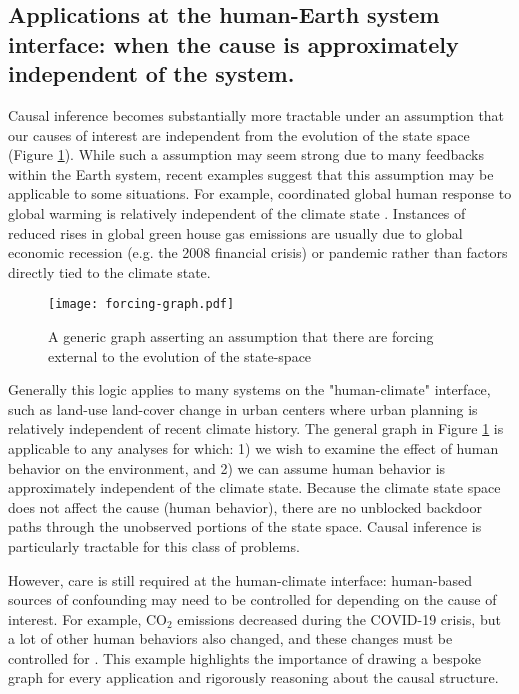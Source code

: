 \documentclass[12pt]{article}
\begin{document}
\subsection{Applications at the human-Earth system interface: when the
  cause is approximately independent of the system.}
\label{human}

Causal inference becomes substantially more tractable under an
assumption that our causes of interest are independent from the
evolution of the state space (Figure \ref{fig:forcing}). While such a
assumption may seem strong due to many feedbacks within
the Earth system, recent examples suggest that this
assumption may be applicable to some situations. For example,
coordinated global human response to global warming is relatively
independent of the climate state \citep{arto2014drivers}. Instances of
reduced rises in global green house gas emissions are usually due to
global economic recession (e.g. the 2008 financial crisis) or pandemic
\citep[COVID-19 crisis,][]{le2020temporary, liu2020near} rather than
factors directly tied to the climate state.

\begin{figure} \texttt{[image: forcing-graph.pdf]}
  \caption{A generic graph asserting an assumption that there are
    forcing external to the evolution of the state-space}
  \label{fig:forcing}
\end{figure}

Generally this logic applies to many systems on the "human-climate"
interface, such as land-use land-cover change in urban centers where
urban planning is relatively independent of recent climate
history. The general graph in Figure \ref{fig:forcing} is applicable
to any analyses for which: 1) we wish to examine the effect of human
behavior on the environment, and 2) we can assume human behavior is
approximately independent of the climate state. Because the climate
state space does not affect the cause (human behavior), there are no
unblocked backdoor paths through the unobserved portions of the state
space. Causal inference is particularly tractable for this class of
problems.

However, care is still required at the human-climate interface:
human-based sources of confounding may need to be controlled for
depending on the cause of interest. For example, CO$_2$ emissions
decreased during the COVID-19 crisis, but a lot of other human
behaviors also changed, and these changes must be controlled for
\citep[e.g., the COVID-19 virus is a common cause to many large
changes in human behavior in 2020,][]{diffenbaugh2020covid}. This
example highlights the importance of drawing a bespoke graph for every
application and rigorously reasoning about the causal structure.
\end{document}
